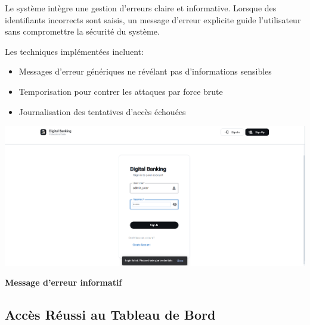 \documentclass[10pt]{article}
\begin{document}
\begin{minipage}{\textwidth}
    \begin{minipage}{0.58\textwidth}
        \begin{secondarybox}[title=Mécanisme de sécurité proactif]
            Le système intègre une gestion d'erreurs claire et informative. Lorsque des identifiants 
            incorrects sont saisis, un message d'erreur explicite guide l'utilisateur sans compromettre 
            la sécurité du système.
            
            \vspace{0.3cm}
            Les techniques implémentées incluent:
            \begin{itemize}[leftmargin=15pt, itemsep=2pt]
                \item Messages d'erreur génériques ne révélant pas d'informations sensibles
                \item Temporisation pour contrer les attaques par force brute
                \item Journalisation des tentatives d'accès échouées
            \end{itemize}
        \end{secondarybox}
    \end{minipage}
    \hfill
    \begin{minipage}{0.38\textwidth}
        \begin{imagebox}
            \includegraphics[width=\textwidth]{screenshots/01_02_login_page_incorrect_credentials.png}
            \caption*{\textbf{\sffamily\small Message d'erreur informatif}}
        \end{imagebox}
    \end{minipage}
\end{minipage}

\vspace{0.8cm}

\subsection{Accès Réussi au Tableau de Bord}
\end{document}
